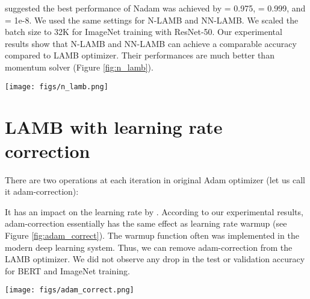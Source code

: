 \documentclass{article} \usepackage{iclr2020_conference,times}
\begin{document}
\cite{dozat2016incorporating} suggested the best performance of Nadam was achieved by  = 0.975,  = 0.999, and  = 1e-8. We used the same settings for N-LAMB and NN-LAMB. We scaled the batch size to 32K for ImageNet training with ResNet-50. Our experimental results show that N-LAMB and NN-LAMB can achieve a comparable accuracy compared to LAMB optimizer. Their performances are much better than momentum solver (Figure \ref{fig:n_lamb}).

\begin{figure*}[tb]
\vspace{5pt}
\centering
\texttt{[image: figs/n\_lamb.png]}
\caption{This figure shows N-LAMB and NN-LAMB can achieve a comparable accuracy compared to LAMB optimizer. Their performances are much better than momentum solver. The result of momentum optimizer was reported by \cite{goyal2017accurate}. For Nadam, we use the learning rate recipe of \citep{goyal2017accurate}: (1) 5-epoch warmup to stablize the initial stage; and (2) multiply the learning rate by 0.1 at 30th, 60th, and 80th epoch. The target accuracy is around 0.763 \citep{goyal2017accurate}. We also tuned the learning rate of Nadam in \{1e-4, 2e-4, ..., 9e-4, 1e-3, 2e-3, ..., 9e-3, 1e-2\}.}
\label{fig:n_lamb}
\vspace{-10pt}
\end{figure*}

\section{LAMB with learning rate correction}

There are two operations at each iteration in original Adam optimizer (let us call it adam-correction):


It has an impact on the learning rate by .
According to our experimental results, adam-correction essentially has the same effect as learning rate warmup (see Figure \ref{fig:adam_correct}). The warmup function often was implemented in the modern deep learning system. Thus, we can remove adam-correction from the LAMB optimizer. We did not observe any drop in the test or validation accuracy for BERT and ImageNet training.

\begin{figure*}[tb]
\vspace{5pt}
\centering
\texttt{[image: figs/adam\_correct.png]}
\caption{The figure shows that adam-correction has the same effect as learning rate warmup. We removed adam-correction from the LAMB optimizer. We did not observe any drop in the test or validation accuracy for BERT and ImageNet training.}
\label{fig:adam_correct}
\vspace{-10pt}
\end{figure*}
\end{document}
